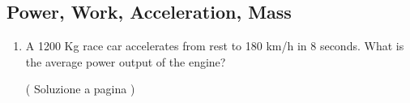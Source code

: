 \subsection{Power, Work, Acceleration, Mass} \label{sec:powoama}

\setcounter{equation}{0}
\begin{enumerate}
\item 
A 1200 Kg race car accelerates from rest to %
180 km/h in %
8 seconds.  What is the average power output of the engine?
\label{ex_f_6} 

( Soluzione a pagina \pageref{sol_f_6} )

\end{enumerate}


